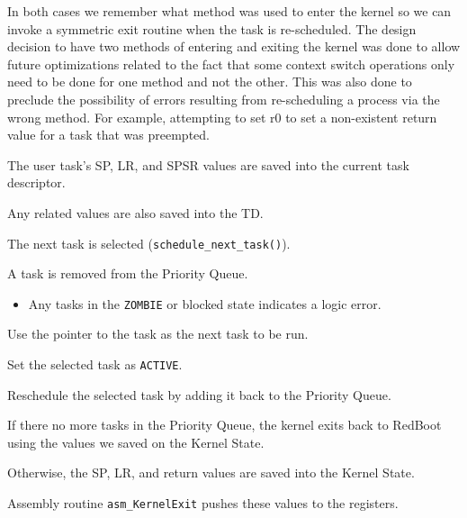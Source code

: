 \documentclass[letterpaper]{article}
\begin{document}
In both cases we remember what method was used to enter the kernel so we can invoke a symmetric exit routine when the task is re-scheduled.  The design decision to have two methods of entering and exiting the kernel was done to allow future optimizations related to the fact that some context switch operations only need to be done for one method and not the other.  This was also done to preclude the possibility of errors resulting from re-scheduling a process via the wrong method.  For example, attempting to set r0 to set a non-existent return value for a task that was preempted.
\setcounter{listcnt0}{0}
\begin{list}{.}
{
\addtocounter{listcnt0}{1}
\setlength{\rightmargin}{\leftmargin}
}

\item The user task's SP, LR, and SPSR values are saved into the current task descriptor.

\item Any related values are also saved into the TD.

\item The next task is selected (\texttt{schedule\_next\_task()}).
\setcounter{listcnt1}{0}
\begin{list}{.}
{
\setlength{\rightmargin}{\leftmargin}
}

\item A task is removed from the Priority Queue.
%
\begin{itemize}

\item Any tasks in the \texttt{ZOMBIE} or blocked state indicates a logic error.

\end{itemize}

\item Use the pointer to the task as the next task to be run.

\item Set the selected task as \texttt{ACTIVE}.

\item Reschedule the selected task by adding it back to the Priority Queue.
\end{list}

\item If there no more tasks in the Priority Queue, the kernel exits back to RedBoot using the values we saved on the Kernel State.

\item Otherwise, the SP, LR, and return values are saved into the Kernel State.

\item Assembly routine \texttt{asm\_KernelExit} pushes these values to the registers.
\end{list}
\end{document}
